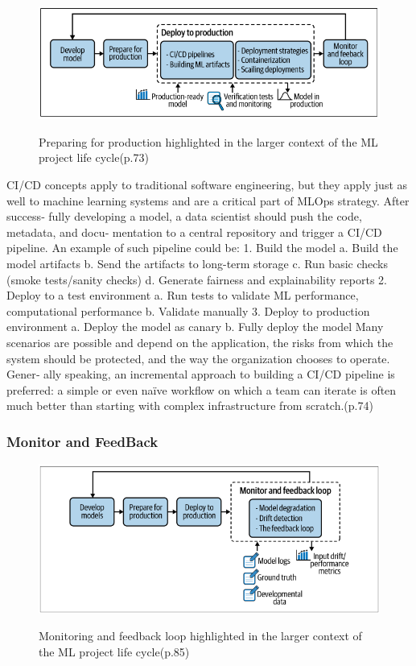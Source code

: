 \begin{figure}[!htbp]
    \caption{Preparing for production highlighted in the larger context of the ML project
    life cycle\cite{treveil2020introducing}(p.73)}
    \centering
    \includegraphics[scale=0.5]{images/deploy-prod}
    \label{fig:deploy-prod}
\end{figure}

CI/CD concepts apply to traditional software engineering, but they apply just as well
to machine learning systems and are a critical part of MLOps strategy. After success‐
fully developing a model, a data scientist should push the code, metadata, and docu‐
mentation to a central repository and trigger a CI/CD pipeline. An example of such
pipeline could be:
1. Build the model
a. Build the model artifacts
b. Send the artifacts to long-term storage
c. Run basic checks (smoke tests/sanity checks)
d. Generate fairness and explainability reports
2. Deploy to a test environment
a. Run tests to validate ML performance, computational performance
b. Validate manually
3. Deploy to production environment
a. Deploy the model as canary
b. Fully deploy the model
Many scenarios are possible and depend on the application, the risks from which the
system should be protected, and the way the organization chooses to operate. Gener‐
ally speaking, an incremental approach to building a CI/CD pipeline is preferred: a
simple or even naïve workflow on which a team can iterate is often much better than
starting with complex infrastructure from scratch.\cite{treveil2020introducing}(p.74)

\subsubsection{Monitor and FeedBack}

\begin{figure}[!htbp]
    \caption{Monitoring and feedback loop highlighted in the larger context of the ML
    project life cycle\cite{treveil2020introducing}(p.85)}
    \centering
    \includegraphics[scale=0.5]{images/monitor-intro}
    \label{fig:monitor-intro}
\end{figure}


